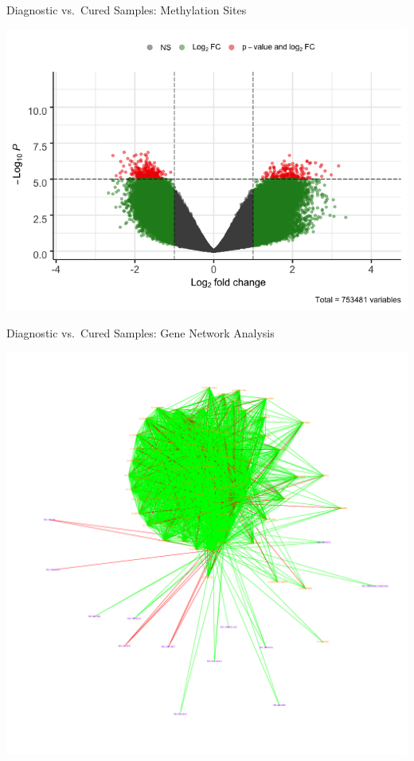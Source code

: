 \documentclass[ignorenonframetext,]{beamer}
\begin{document}
\begin{frame}{Diagnostic vs.~Cured Samples: Methylation Sites}
\protect\hypertarget{diagnostic-vs.cured-samples-methylation-sites}{}

\includegraphics[height=0.85\textheight]{final_presentation_slides_files/figure-beamer/DRDC_methyl_volcano-1}

\end{frame}

\begin{frame}{Diagnostic vs.~Cured Samples: Gene Network Analysis}
\protect\hypertarget{diagnostic-vs.cured-samples-gene-network-analysis}{}

\begin{center}\includegraphics[width=0.7\linewidth]{images/DRDCNet1} \end{center}

\end{frame}
\end{document}
